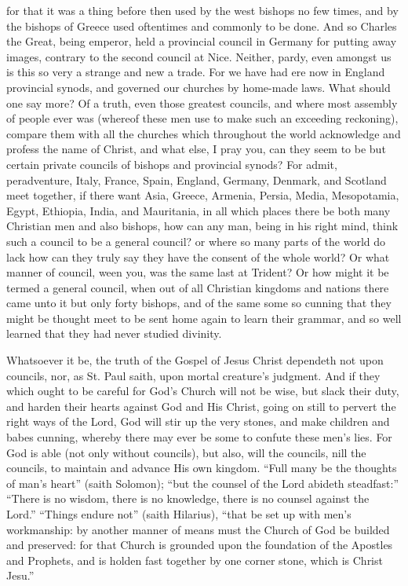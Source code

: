 for that it was a thing before then used by the west bishops no few
times, and by the bishops of Greece used oftentimes and commonly to
be done. And so Charles the Great, being emperor, held a provincial
council in Germany for putting away images, contrary to the second council
at Nice. Neither,
pardy, even amongst us is this so very a strange and new a trade.
For we have had ere now in England provincial synods, and governed our
churches by home-made laws. What should one say more? Of
a truth, even those greatest councils, and where most assembly of people
ever was (whereof these men use to make such an exceeding reckoning),
compare them with all the churches which throughout the world acknowledge
and profess the name of Christ, and what else, I pray you, can they
seem to be but certain private councils of bishops and provincial synods?
For admit, peradventure, Italy, France, Spain, England, Germany, Denmark,
and Scotland meet together, if there want Asia, Greece, Armenia, Persia,
Media, Mesopotamia, Egypt, Ethiopia, India, and Mauritania, in all which
places there be both many Christian men and also bishops, how can any
man, being in his right mind, think such a council to be a general council?
or where so many parts of the world do lack how can they truly say they
have the consent of the whole world? Or what manner of council,
ween you, was the same last at Trident? Or how might it be termed
a general council, when out of all Christian kingdoms and nations there
came unto it but only forty bishops, and of the same some
so cunning that they might be thought meet to be sent home again to
learn their grammar, and so well learned that they had never studied
divinity.

Whatsoever it be, the truth of the Gospel of Jesus Christ dependeth
not upon councils, nor, as St. Paul saith, upon mortal creature’s
judgment. And if they which ought to be careful for God’s
Church will not be wise, but slack their duty, and harden their hearts
against God and His Christ, going on still to pervert the right ways
of the Lord, God will stir up the very stones, and make children and
babes cunning, whereby there may ever be some to confute these men’s
lies. For God is able (not only without councils), but also, will
the councils, nill the councils, to maintain and advance His own kingdom.
“Full many be the thoughts of man’s heart” (saith
Solomon); “but the counsel of the Lord abideth steadfast:”
“There is no wisdom, there is no knowledge, there is no counsel
against the Lord.” “Things endure not” (saith
Hilarius), “that be set up with men’s workmanship: by another
manner of means must the Church of God be builded and preserved: for
that Church is grounded upon the foundation of the Apostles and Prophets,
and is holden fast together by one corner stone, which is Christ Jesu.”

